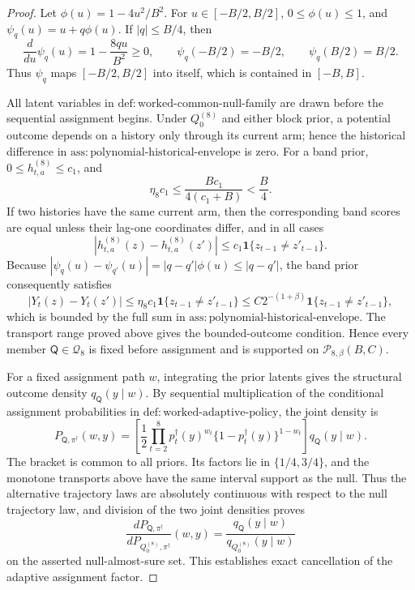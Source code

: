 \documentclass{article}
\begin{document}
\begin{proof}
Let \(\phi(u)=1-4u^2/B^2\).  For \(u\in[-B/2,B/2]\), \(0\le\phi(u)\le1\), and \(\psi_q(u)=u+q\phi(u)\).  If \(\lvert q\rvert\le B/4\), then
\[
 \frac{d}{du}\psi_q(u)=1-\frac{8qu}{B^2}\ge0,
 \qquad
 \psi_q(-B/2)=-B/2,
 \qquad
 \psi_q(B/2)=B/2.
\]
Thus \(\psi_q\) maps \([-B/2,B/2]\) into itself, which is contained in \([-B,B]\).

All latent variables in \(\mathrm{def{:}worked\mbox{-}common\mbox{-}null\mbox{-}family}\) are drawn before the sequential assignment begins.  Under \(Q_0^{(8)}\) and either block prior, a potential outcome depends on a history only through its current arm; hence the historical difference in \(\mathrm{ass{:}polynomial\mbox{-}historical\mbox{-}envelope}\) is zero.  For a band prior, \(0\le h_{t,a}^{(8)}\le c_1\), and
\[
 \eta_8c_1\le \frac{Bc_1}{4(c_1+B)}<\frac B4.
\]
If two histories have the same current arm, then the corresponding band scores are equal unless their lag-one coordinates differ, and in all cases
\[
 |h_{t,a}^{(8)}(z)-h_{t,a}^{(8)}(z')|
 \le c_1\mathbf 1\{z_{t-1}\ne z'_{t-1}\}.
\]
Because \(|\psi_q(u)-\psi_{q'}(u)|=|q-q'|\phi(u)\le|q-q'|\), the band prior consequently satisfies
\[
 |Y_t(z)-Y_t(z')|
 \le\eta_8c_1\mathbf 1\{z_{t-1}\ne z'_{t-1}\}
 \le C2^{-(1+\beta)}\mathbf 1\{z_{t-1}\ne z'_{t-1}\},
\]
which is bounded by the full sum in \(\mathrm{ass{:}polynomial\mbox{-}historical\mbox{-}envelope}\).  The transport range proved above gives the bounded-outcome condition.  Hence every member \(\mathsf Q\in\mathcal Q_8\) is fixed before assignment and is supported on \(\mathcal P_{8,\beta}(B,C)\).

For a fixed assignment path \(w\), integrating the prior latents gives the structural outcome density \(q_{\mathsf Q}(y\mid w)\).  By sequential multiplication of the conditional assignment probabilities in \(\mathrm{def{:}worked\mbox{-}adaptive\mbox{-}policy}\), the joint density is
\[
 P_{\mathsf Q,\pi^\dagger}(w,y)
 =\left[\frac12\prod_{t=2}^8p_t^\dagger(y)^{w_t}
 \{1-p_t^\dagger(y)\}^{1-w_t}\right]q_{\mathsf Q}(y\mid w).
\]
The bracket is common to all priors.  Its factors lie in \(\{1/4,3/4\}\), and the monotone transports above have the same interval support as the null.  Thus the alternative trajectory laws are absolutely continuous with respect to the null trajectory law, and division of the two joint densities proves
\[
 \frac{dP_{\mathsf Q,\pi^\dagger}}
 {dP_{Q_0^{(8)},\pi^\dagger}}(w,y)
 =\frac{q_{\mathsf Q}(y\mid w)}{q_{Q_0^{(8)}}(y\mid w)}
\]
on the asserted null-almost-sure set.  This establishes exact cancellation of the adaptive assignment factor.


\end{proof}
\end{document}
